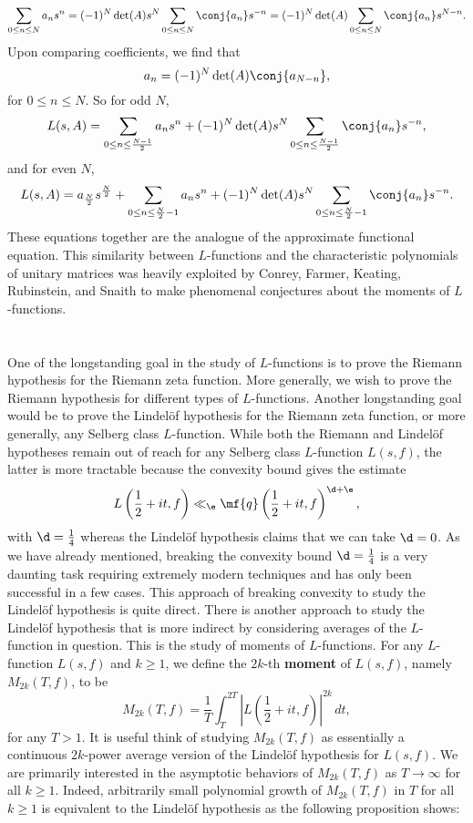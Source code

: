       \[
        \sum_{0 \le n \le N}a_{n}s^{n} = (-1)^{N}\det(A)s^{N}\sum_{0 \le n \le N}\conj{a_{n}}s^{-n} = (-1)^{N}\det(A)\sum_{0 \le n \le N}\conj{a_{n}}s^{N-n}.
      \]
      Upon comparing coefficients, we find that
      \[
        a_{n} = (-1)^{N}\det(A)\conj{a_{N-n}},
      \]
      for $0 \le n \le N$. So for odd $N$,
      \[
        L(s,A) = \sum_{0 \le n \le \frac{N-1}{2}}a_{n}s^{n}+(-1)^{N}\det(A)s^{N}\sum_{0 \le n \le \frac{N-1}{2}}\conj{a_{n}}s^{-n},
      \]
      and for even $N$,
      \[
        L(s,A) = a_{\frac{N}{2}}s^{\frac{N}{2}}+\sum_{0 \le n \le \frac{N}{2}-1}a_{n}s^{n}+(-1)^{N}\det(A)s^{N}\sum_{0 \le n \le \frac{N}{2}-1}\conj{a_{n}}s^{-n}.
      \]
      These equations together are the analogue of the approximate functional equation. This similarity between $L$-functions and the characteristic polynomials of unitary matrices was heavily exploited by Conrey, Farmer, Keating, Rubinstein, and Snaith to make phenomenal conjectures about the moments of $L$-functions.
  \section{}
    One of the longstanding goal in the study of $L$-functions is to prove the Riemann hypothesis for the Riemann zeta function. More generally, we wish to prove the Riemann hypothesis for different types of $L$-functions. Another longstanding goal would be to prove the Lindel\"of hypothesis for the Riemann zeta function, or more generally, any Selberg class $L$-function. While both the Riemann and Lindel\"of hypotheses remain out of reach for any Selberg class $L$-function $L(s,f)$, the latter is more tractable because the convexity bound gives the estimate
    \[
      L\left(\frac{1}{2}+it,f\right) \ll_{\e} \mf{q}\left(\frac{1}{2}+it,f\right)^{\d+\e},
    \]
    with $\d = \frac{1}{4}$ whereas the Lindel\"of hypothesis claims that we can take $\d = 0$. As we have already mentioned, breaking the convexity bound $\d = \frac{1}{4}$ is a very daunting task requiring extremely modern techniques and has only been successful in a few cases. This approach of breaking convexity to study the Lindel\"of hypothesis is quite direct. There is another approach to study the Lindel\"of hypothesis that is more indirect by considering averages of the $L$-function in question. This is the study of moments of $L$-functions. For any $L$-function $L(s,f)$ and $k \ge 1$, we define the $2k$-th \textbf{moment} of $L(s,f)$, namely $M_{2k}(T,f)$, to be
    \[
      M_{2k}(T,f) = \frac{1}{T}\int_{T}^{2T}\left|L\left(\frac{1}{2}+it,f\right)\right|^{2k}\,dt,
    \]
    for any $T > 1$. It is useful think of studying $M_{2k}(T,f)$ as essentially a continuous $2k$-power average version of the Lindel\"of hypothesis for $L(s,f)$. We are primarily interested in the asymptotic behaviors of $M_{2k}(T,f)$ as $T \to \infty$ for all $k \ge 1$. Indeed, arbitrarily small polynomial growth of $M_{2k}(T,f)$ in $T$ for all $k \ge 1$ is equivalent to the Lindel\"of hypothesis as the following proposition shows:

